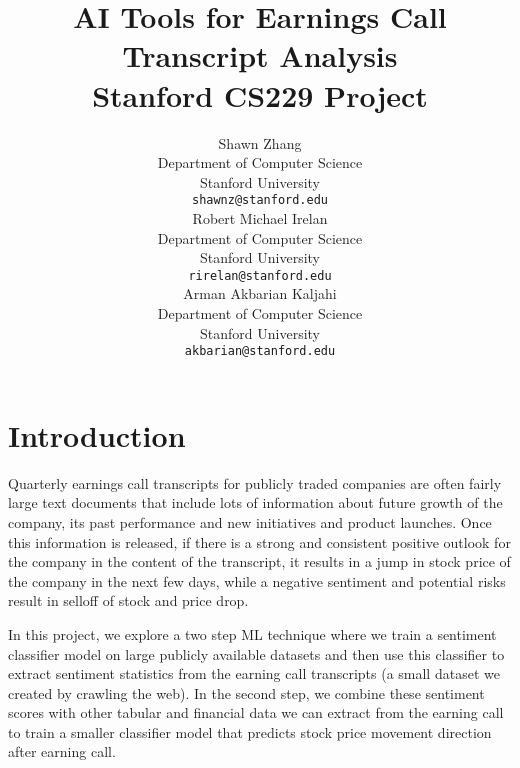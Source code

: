 \documentclass{article}
\title{
  AI Tools for Earnings Call Transcript Analysis \\
  \vspace{1em}
  \small{\normalfont Stanford CS229 Project}  %
}
\author{
  Shawn Zhang  \\
  Department of Computer Science \\
  Stanford University \\
  \texttt{shawnz@stanford.edu} \\
   \And
  Robert Michael Irelan \\
  Department of Computer Science \\
  Stanford University \\
  \texttt{rirelan@stanford.edu} \\
   \And
Arman Akbarian Kaljahi  \\
  Department of Computer Science \\
  Stanford University \\
  \texttt{akbarian@stanford.edu} \\
}
\newcommand{\TODO}[1]{\textcolor{red}{{TODO:~#1}}}
\newif\ifshowInstructions
\newcommand{\instructions}[1]{%
    \ifshowInstructions%
        \textcolor{violet}{#1}%
    \fi%
}
\begin{document}
\maketitle




\section{Introduction\instructions{{} | 0.5 page}}
\instructions{%
Explain the problem and why it is important. Discuss your motivation for pursuing this problem. Give some background if necessary. Clearly state what the input and output is. Be very explicit: “The input to our algorithm is an {image, amplitude, patient age, rainfall measurements, grayscale video, etc.}. We then use a {SVM, neural network, linear regression, etc.} to output a predicted {age, stock price, cancer type, music genre, etc.}.” This is very important since different teams have different inputs/outputs spanning different application domains. Being explicit about this makes it easier for readers. If you are using your project for multiple classes, add a paragraph explaining which components of the project were used for each class.}

Quarterly earnings call transcripts for publicly traded companies are 
often fairly large text documents that include lots of information about 
future growth of the company, its past performance and new initiatives 
and product launches. Once this information is released, if there is 
a strong and consistent positive outlook for the company in the 
content of the transcript, it results in a jump in stock price 
of the company in the next few days, while a negative sentiment 
and potential risks result in selloff of stock and price drop. 

In this project, we explore a two step ML technique where we
train a sentiment classifier model on large publicly available datasets 
and then use this classifier to extract sentiment statistics from the earning
call transcripts (a small dataset we created by crawling the web). 
In the second step, we combine these sentiment scores with other tabular and financial 
data we can extract from the earning call to train a smaller
classifier model that predicts stock price movement direction after earning call. 
\end{document}
